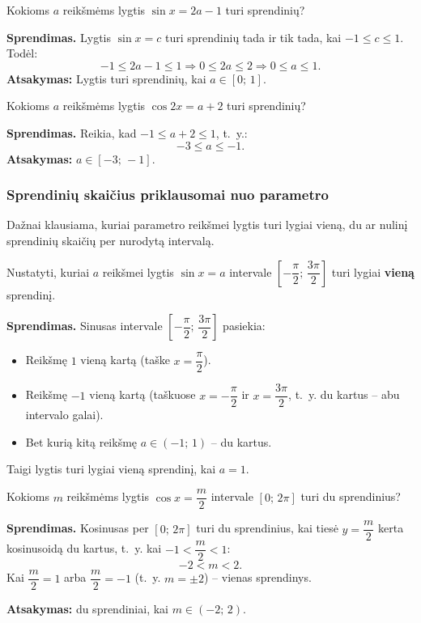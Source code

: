 \begin{example}
Kokioms \(a\) reikšmėms lygtis \(\sin x = 2a - 1\) turi sprendinių?

\textbf{Sprendimas.} Lygtis \(\sin x = c\) turi sprendinių tada ir tik tada, kai \(-1 \leq c \leq 1\). Todėl:
\[
-1 \leq 2a - 1 \leq 1 \Rightarrow 0 \leq 2a \leq 2 \Rightarrow 0 \leq a \leq 1.
\]
\textbf{Atsakymas:} Lygtis turi sprendinių, kai \(a \in [0;\, 1]\).
\end{example}

\begin{example}
Kokioms \(a\) reikšmėms lygtis \(\cos 2x = a + 2\) turi sprendinių?

\textbf{Sprendimas.} Reikia, kad \(-1 \leq a + 2 \leq 1\), t.~y.:
\[
-3 \leq a \leq -1.
\]
\textbf{Atsakymas:} \(a \in [-3;\, -1]\).
\end{example}

\subsubsection{Sprendinių skaičius priklausomai nuo parametro}

Dažnai klausiama, kuriai parametro reikšmei lygtis turi lygiai vieną, du ar nulinį sprendinių skaičių per nurodytą intervalą.

\begin{example}
Nustatyti, kuriai \(a\) reikšmei lygtis \(\sin x = a\) intervale \(\left[-\dfrac{\pi}{2};\, \dfrac{3\pi}{2}\right]\) turi lygiai \textbf{vieną} sprendinį.

\textbf{Sprendimas.} Sinusas intervale \(\left[-\dfrac{\pi}{2};\, \dfrac{3\pi}{2}\right]\) pasiekia:
\begin{itemize}
    \item Reikšmę \(1\) vieną kartą (taške \(x = \dfrac{\pi}{2}\)).
    \item Reikšmę \(-1\) vieną kartą (taškuose \(x = -\dfrac{\pi}{2}\) ir \(x = \dfrac{3\pi}{2}\), t.~y. du kartus – abu intervalo galai).
    \item Bet kurią kitą reikšmę \(a \in (-1;\, 1)\) – du kartus.
\end{itemize}
Taigi lygtis turi lygiai vieną sprendinį, kai \(a = 1\).
\end{example}

\begin{example}
Kokioms \(m\) reikšmėms lygtis \(\cos x = \dfrac{m}{2}\) intervale \([0;\, 2\pi]\) turi du sprendinius?

\textbf{Sprendimas.} Kosinusas per \([0;\, 2\pi]\) turi du sprendinius, kai tiesė \(y = \dfrac{m}{2}\) kerta kosinusoidą du kartus, t.~y. kai \(-1 < \dfrac{m}{2} < 1\):
\[
-2 < m < 2.
\]
Kai \(\dfrac{m}{2} = 1\) arba \(\dfrac{m}{2} = -1\) (t.~y. \(m = \pm 2\)) – vienas sprendinys.

\textbf{Atsakymas:} du sprendiniai, kai \(m \in (-2;\, 2)\).
\end{example}

